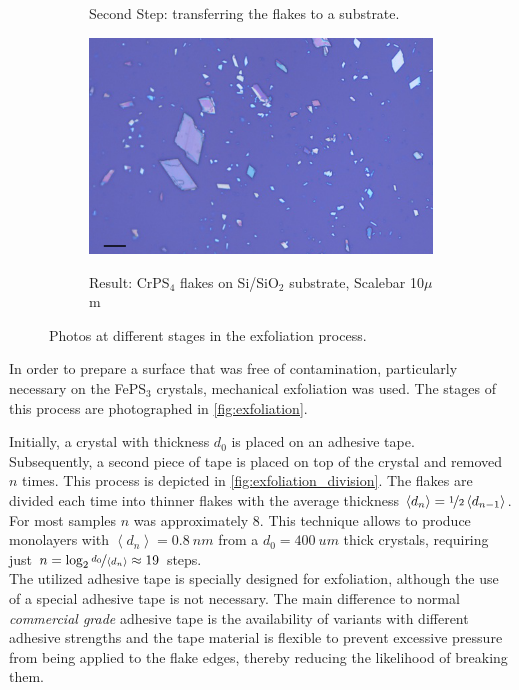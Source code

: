 \documentclass[
	twoside,
	parskip=half,
	a4paper,
]{scrbook}
\begin{document}
\begin{figure}[h]
\begin{subfigure}[t]{.3\textwidth}
		\caption{Second Step: transferring the flakes to a substrate.}
		\label{fig:exfoliation_transfer}
	\end{subfigure}
	\begin{subfigure}[t]{.3\textwidth}
		\vskip 0pt
		\includegraphics[width=\textwidth]{../../data/2023-12-04_LO_MG_NiPS3/CrPS4_50x_10um.png}\\
		\caption{Result: CrPS$_\text{4}$ flakes on Si/SiO$_\text{2}$ substrate, Scalebar 10$\mu$m}
		\label{fig:exfoliation_result}
	\end{subfigure}
	\caption{Photos at different stages in the exfoliation process.}
	\label{fig:exfoliation}
\end{figure}
In order to prepare a surface that was free of contamination, particularly necessary on the FePS$_3$ crystals, mechanical exfoliation was used.
The stages of this process are photographed in \autoref{fig:exfoliation}.

Initially, a crystal with thickness $d_0$ is placed on an adhesive tape.\\
Subsequently, a second piece of tape is placed on top of the crystal and removed $n$ times.
This process is depicted in \autoref{fig:exfoliation_division}.
The flakes are divided each time into thinner flakes with the average thickness $\left< d_{n} \right> = \nicefrac{1}{2} \left< d_{n-1} \right>$.\\
For most samples $n$ was approximately $8$.
This technique allows to produce monolayers with $ \left<d_n\right>  = \SI{0.8}{nm}$ \cite{NiPS3_few_layer} from a $d_0 = \SI{400}{um}$ thick crystals, requiring just $n = \log_2 \nicefrac{d_0}{\left<d_n\right>} \approx 19$ steps.\\
The utilized adhesive tape is specially designed for exfoliation, although the use of a special adhesive tape is not necessary.
The main difference to normal \textit{commercial grade} adhesive tape is the availability of variants with different adhesive strengths 
and the tape material is flexible to prevent excessive pressure from being applied to the flake edges, thereby reducing the likelihood of breaking them.
\end{document}
